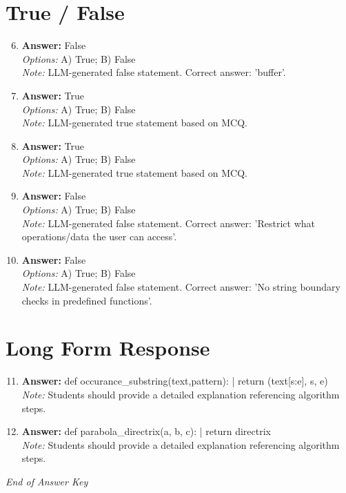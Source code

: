 \documentclass[12pt]{article}
\begin{document}
\section*{True / False}
\begin{enumerate}[label=\arabic*.]
\setcounter{enumi}{5}
\item \textbf{Answer:} False
\\ \textit{Options:} A) True; B) False
\\ \textit{Note:} LLM-generated false statement. Correct answer: 'buffer'.
\item \textbf{Answer:} True
\\ \textit{Options:} A) True; B) False
\\ \textit{Note:} LLM-generated true statement based on MCQ.
\item \textbf{Answer:} True
\\ \textit{Options:} A) True; B) False
\\ \textit{Note:} LLM-generated true statement based on MCQ.
\item \textbf{Answer:} False
\\ \textit{Options:} A) True; B) False
\\ \textit{Note:} LLM-generated false statement. Correct answer: 'Restrict what operations/data the user can access'.
\item \textbf{Answer:} False
\\ \textit{Options:} A) True; B) False
\\ \textit{Note:} LLM-generated false statement. Correct answer: 'No string boundary checks in predefined functions'.
\end{enumerate}

\section*{Long Form Response}
\begin{enumerate}[label=\arabic*.]
\setcounter{enumi}{10}
\item \textbf{Answer:} def occurance\_substring(text,pattern): | return (text[s:e], s, e)
\\ \textit{Note:} Students should provide a detailed explanation referencing algorithm steps.
\item \textbf{Answer:} def parabola\_directrix(a, b, c): | return directrix
\\ \textit{Note:} Students should provide a detailed explanation referencing algorithm steps.
\end{enumerate}

\vfill
\noindent\textit{End of Answer Key}
\end{document}
